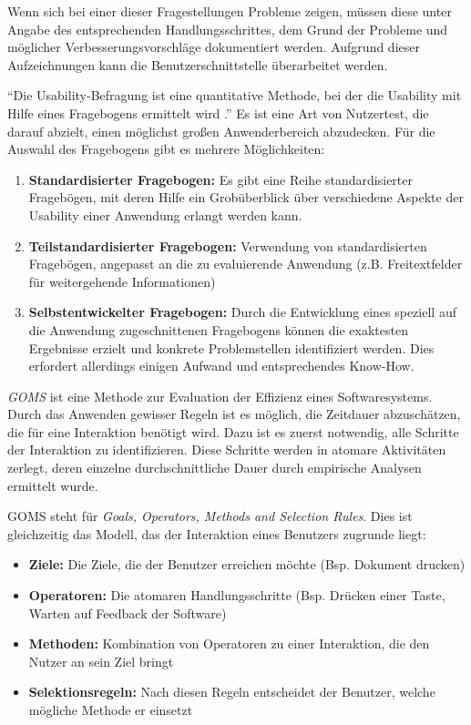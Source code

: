 Wenn sich bei einer dieser Fragestellungen Probleme zeigen, müssen diese unter Angabe des entsprechenden Handlungsschrittes, dem Grund der Probleme und möglicher Verbesserungsvorschläge dokumentiert werden. Aufgrund dieser Aufzeichnungen kann die Benutzerschnittstelle überarbeitet werden.\par
{}
\enquote{Die Usability-Befragung ist eine quantitative Methode, bei der die Usability mit Hilfe eines Fragebogens ermittelt wird \cite[S. 236]{Moser2012}.} Es ist eine Art von Nutzertest, die darauf abzielt, einen möglichst großen Anwenderbereich abzudecken. Für die Auswahl des Fragebogens gibt es mehrere Möglichkeiten:
\begin{enumerate}
	\item \textbf{Standardisierter Fragebogen:} Es gibt eine Reihe standardisierter Fragebögen, mit deren Hilfe ein Grobüberblick über verschiedene Aspekte der Usability einer Anwendung erlangt werden kann.
	\item \textbf{Teilstandardisierter Fragebogen:} Verwendung von standardisierten Fragebögen, angepasst an die zu evaluierende Anwendung (z.B. Freitextfelder für weitergehende Informationen)
	\item \textbf{Selbstentwickelter Fragebogen:} Durch die Entwicklung eines speziell auf die Anwendung zugeschnittenen Fragebogens können die exaktesten Ergebnisse erzielt und konkrete Problemstellen identifiziert werden. Dies erfordert allerdings einigen Aufwand und entsprechendes Know-How.
\end{enumerate}
\textit{GOMS} ist eine Methode zur Evaluation der Effizienz eines Softwaresystems. Durch das Anwenden gewisser Regeln ist es möglich, die Zeitdauer abzuschätzen, die für eine Interaktion benötigt wird. Dazu ist es zuerst notwendig, alle Schritte der Interaktion zu identifizieren. Diese Schritte werden in atomare Aktivitäten zerlegt, deren einzelne durchschnittliche Dauer durch empirische Analysen ermittelt wurde.\par
GOMS steht für \textit{Goals, Operators, Methods and Selection Rules}. Dies ist gleichzeitig das Modell, das der Interaktion eines Benutzers zugrunde liegt:
\begin{itemize}
	\item \textbf{Ziele:} Die Ziele, die der Benutzer erreichen möchte (Bsp. Dokument drucken)
	\item \textbf{Operatoren:} Die atomaren Handlungsschritte (Bsp. Drücken einer Taste, Warten auf Feedback der Software)
	\item \textbf{Methoden:} Kombination von Operatoren zu einer Interaktion, die den Nutzer an sein Ziel bringt
	\item \textbf{Selektionsregeln:} Nach diesen Regeln entscheidet der Benutzer, welche mögliche Methode er einsetzt
\end{itemize}
